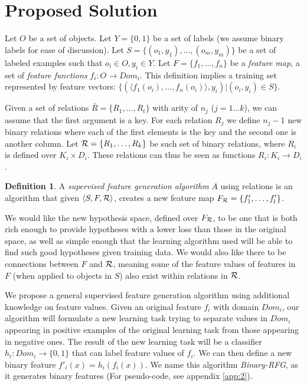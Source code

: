 \documentclass[12pt, a4paper]{article}
\theoremstyle{definition}
\newtheorem{defn}{Definition}[section]
\begin{document}
\section{Proposed Solution}

Let $O$ be a set of objects. Let $Y=\{0,1\}$ be a set of labels (we assume binary labels for ease of discussion). Let $S=\{(o_{1},y_{1}),\ldots,(o_{m},y_{m})\}$ be a set of labeled examples such that $o_{i}\in O, y_{i}\in Y$. Let $F=\{f_{1},\ldots,f_{n}\}$ be a \emph{feature map}, a set of \emph{feature functions} $f_{i}:O\rightarrow Dom_{i}$.  This definition implies a training set represented by feature vectors: $\{ (\langle f_1(o_i),\ldots,f_n(o_i)\rangle, y_i) | (o_i,y_i) \in S\}$.

Given a set of relations $\bar{R}=\{R_{1},\ldots,R_{t}\}$ with arity of $n_{j}$ ($j=1\ldots k$), we can assume  that the first argument is a key. For each relation $R_{j}$ we define $n_{j}-1$ new binary relations where each of the first elements is the key and the second one is another column.
Let ${\cal R}=\{R_{1},\ldots,R_{k}\}$ be such set of binary relations, where $R_{i}$ is defined over $K_{i}\times D_{i}$. These relations can thus be seen as functions $R_{i}: K_{i}\rightarrow D_{i}$.

\begin{defn}
A \emph{supervised feature generation algorithm} $A$ using relations is an algorithm that given $\langle S,F,{\cal R} \rangle$, creates a new feature map $F_{\cal R}=\{f'_{1},\ldots,f'_{l}\}$.
\end{defn}

We would like the new hypothesis space, defined over $F_{\cal R}$, to be one that is both rich enough to provide hypotheses with a lower loss than those in the original space, as well as simple enough that the learning algorithm used will be able to find such good hypotheses given training data.
We would also like there to be connections between $F$ and ${\cal R}$, meaning some of the feature values of features in $F$ (when applied to objects in $S$) also exist within relations in $\cal R$.

We propose a general supervised feature generation algorithm using additional knowledge on feature values.
Given an original feature $f_{i}$ with domain $Dom_i$, our algorithm will formulate a new learning task trying to separate values in $Dom_i$ appearing in positive examples of the original learning task from those appearing in negative ones.  The result of the new learning task will be a classifier
$h_{i}:Dom_{i}\rightarrow \{0,1\}$ that can label feature values of $f_{i}$. We can then define a new binary feature $f'_{i}(x)=h_{i}(f_{i}(x))$.
We name this algorithm \emph{Binary-RFG}, as it generates binary features (For pseudo-code, see appendix \ref{app:2}).
\end{document}

